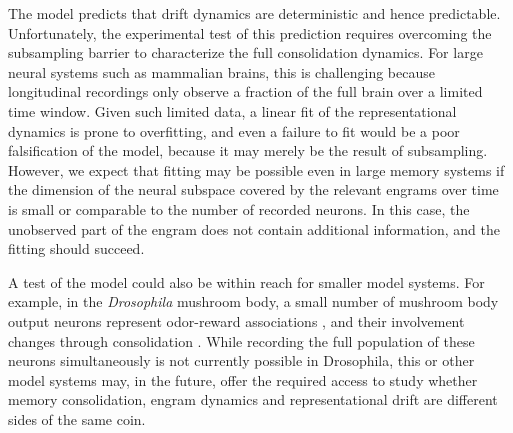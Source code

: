 The model predicts that drift dynamics are deterministic and hence predictable. Unfortunately, the experimental test of this prediction requires overcoming the subsampling barrier \citep{Wilting2018,Levina2022,Qian2024} to characterize the full consolidation dynamics. For large neural systems such as mammalian brains, this is challenging because longitudinal recordings only observe a fraction of the full brain over a limited time window. Given such limited data, a linear fit of the representational dynamics is prone to overfitting, and even a failure to fit would be a poor falsification of the model, because it may merely be the result of subsampling. However, we expect that fitting may be possible even in large memory systems if the dimension of the neural subspace covered by the relevant engrams over time is small or comparable to the number of recorded neurons. In this case, the unobserved part of the engram does not contain additional information, and the fitting should succeed. 

 A test of the model could also be within reach for smaller model systems. For example, in the \textit{Drosophila} mushroom body, a small number of mushroom body output neurons represent odor-reward associations \citep{Owald2015b}, and their involvement changes through consolidation \citep{Cervantes-Sandoval2013}. While recording the full population of these neurons simultaneously is not currently possible in Drosophila, this or other model systems may, in the future, offer the required access to study whether memory consolidation, engram dynamics and representational drift are different sides of the same coin. 
